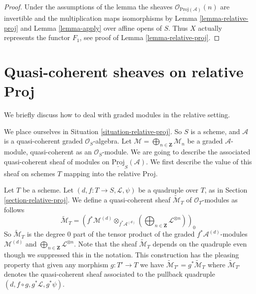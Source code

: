 \documentclass{stacks-project}
\theoremstyle{plain}
\theoremstyle{definition}
\theoremstyle{remark}
\numberwithin{equation}{subsection}
\begin{document}
\begin{proof}
Under the assumptions of the lemma the sheaves
$\mathcal{O}_{\underline{\text{Proj}}(\mathcal{A})}(n)$
are invertible and the multiplication maps isomorphisms
by Lemma \ref{lemma-relative-proj} and
Lemma \ref{lemma-apply}
over affine opens of $S$. Thus $X$ actually represents the
functor $F_1$, see proof of Lemma \ref{lemma-relative-proj}.
\end{proof}












\section{Quasi-coherent sheaves on relative Proj}
\label{section-quasi-coherent-relative-proj}

\noindent
We briefly discuss how to deal with graded modules in the relative
setting.

\medskip\noindent
We place ourselves in Situation \ref{situation-relative-proj}.
So $S$ is a scheme, and
$\mathcal{A}$ is a quasi-coherent graded $\mathcal{O}_S$-algebra.
Let $\mathcal{M} = \bigoplus_{n \in \mathbf{Z}} \mathcal{M}_n$
be a graded $\mathcal{A}$-module, quasi-coherent as an $\mathcal{O}_S$-module.
We are going to describe the associated quasi-coherent sheaf
of modules on $\underline{\text{Proj}}_S(\mathcal{A})$.
We first describe the value of this sheaf on schemes $T$ mapping
into the relative Proj.

\medskip\noindent
Let $T$ be a scheme. Let $(d, f : T \to S, \mathcal{L}, \psi)$
be a quadruple over $T$, as in Section \ref{section-relative-proj}.
We define a quasi-coherent sheaf
$\widetilde{\mathcal{M}}_T$ of $\mathcal{O}_T$-modules
as follows
\begin{equation}
\label{equation-widetilde-M}
\widetilde{\mathcal{M}}_T =
\left(
f^*\mathcal{M}^{(d)}
\otimes_{f^*\mathcal{A}^{(d)}}
\left(\bigoplus\nolimits_{n \in \mathbf{Z}} \mathcal{L}^{\otimes n}\right)
\right)_0
\end{equation}
So $\widetilde{\mathcal{M}}_T$ is the degree $0$ part
of the tensor product of the graded $f^*\mathcal{A}^{(d)}$-modules
$\mathcal{M}^{(d)}$ and
$\bigoplus\nolimits_{n \in \mathbf{Z}} \mathcal{L}^{\otimes n}$.
Note that the sheaf $\widetilde{\mathcal{M}}_T$ depends on the quadruple
even though we suppressed this in the notation.
This construction has the pleasing property that
given any morphism $g : T' \to T$ we have
$\widetilde{\mathcal{M}}_{T'} = g^*\widetilde{\mathcal{M}}_T$
where $\widetilde{\mathcal{M}}_{T'}$ denotes the quasi-coherent
sheaf associated to the pullback quadruple
$(d, f \circ g, g^*\mathcal{L}, g^*\psi)$.
\end{document}
